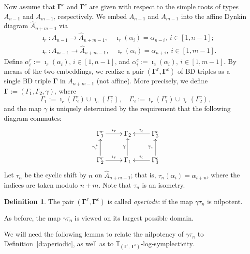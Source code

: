\documentclass[11pt]{article}
\newcommand{\bg}{\mathbf{\Gamma}}
\theoremstyle{definition}\newtheorem{definition}[theorem]{Definition}
\theoremstyle{definition}\newtheorem{remark}[theorem]{Remark}
\theoremstyle{remark}
\numberwithin{equation}{section}
\begin{document}
Now assume that $\bg^r$ and $\bg^c$ are given with respect to the simple roots of types $A_{n-1}$ and $A_{m-1}$, respectively. We embed $A_{n-1}$ and $A_{m-1}$ into the affine Dynkin diagram $\hat{A}_{n+m-1}$ via
\begin{align*}
    &\imath_r : A_{n-1} \rightarrow \hat{A}_{n+m-1}, \quad \imath_r(\alpha_i) = \alpha_{n-i}, \ i \in [1,n-1];\\
    &\imath_c : A_{m-1} \rightarrow \hat{A}_{n+m-1}, \quad \imath_c(\alpha_i) = \alpha_{n+i}, \ i \in [1,m-1].
\end{align*}
Define $\alpha_i^r := \imath_r(\alpha_i)$, $i \in [1,n-1]$, and $\alpha_i^c :=\imath_c(\alpha_i)$, $i \in [1,m-1]$. By means of the two embeddings, we realize a pair $(\bg^r,\bg^c)$ of BD triples as a single BD triple $\bg$ in $A_{n+m-1}$ (not affine). More precisely, we define $\bg:=(\Gamma_1,\Gamma_2,\gamma)$, where 
\begin{equation*}
    \Gamma_1 := \imath_r(\Gamma_2^r)\cup \imath_c(\Gamma_1^c), \quad \Gamma_2 := \imath_r(\Gamma_1^r)\cup \imath_c(\Gamma_2^c),
\end{equation*}
and the map $\gamma$ is uniquely determined by the requirement that the following diagram commutes:
\begin{equation}\label{eq:defg}
    \xymatrix{
    \Gamma_1^r \ar[r]^{\imath_r} & \Gamma_2 & \Gamma_2^c\ar[l]_{\imath_c}\\
    \Gamma_2^r\ar[u]^{\gamma^*_r} \ar[r]^{\imath_r} & \Gamma_1 \ar[u]^{\gamma} & \Gamma_1^c \ar[l]_{\imath_c} \ar[u]^{\gamma_c}
    }
\end{equation}
Let $\tau_n$ be the cyclic shift by $n$ on $\hat{A}_{n+m-1}$; that is, $\tau_n(\alpha_i) = \alpha_{i+n}$, where the indices are taken modulo $n+m$. Note that $\tau_n$ is an isometry.
\begin{definition}\label{d:aperiodic_mat}
The pair $(\bg^r,\bg^c)$ is called \emph{aperiodic} if the map $\gamma\tau_n$ is nilpotent. 
\end{definition}
As before, the map $\gamma\tau_n$ is viewed on its largest possible domain. 

We will need the following lemma to relate the nilpotency of $\gamma\tau_n$ to Definition~\ref{d:aperiodic}, as well as to $\mathbb{T}_{(\bg^r,\bg^c)}$-log-symplecticity.
\end{document}
